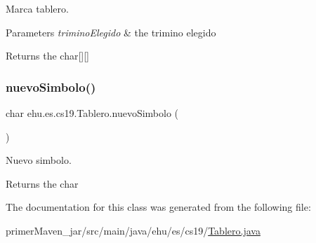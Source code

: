 Marca tablero.


\begin{DoxyParams}{Parameters}
{\em trimino\+Elegido} & the trimino elegido \\
\hline
\end{DoxyParams}
\begin{DoxyReturn}{Returns}
the char\mbox{[}\mbox{]}\mbox{[}\mbox{]} 
\end{DoxyReturn}
\mbox{\label{classehu_1_1es_1_1cs19_1_1_tablero_a35427ed7692ad59556f26281d22625fe}} 
\subsubsection{\texorpdfstring{nuevoSimbolo()}{nuevoSimbolo()}}
{\footnotesize\ttfamily char ehu.\+es.\+cs19.\+Tablero.\+nuevo\+Simbolo (\begin{DoxyParamCaption}{ }\end{DoxyParamCaption})}

Nuevo simbolo.

\begin{DoxyReturn}{Returns}
the char 
\end{DoxyReturn}


The documentation for this class was generated from the following file\+:\begin{DoxyCompactItemize}
\item 
primer\+Maven\+\_\+jar/src/main/java/ehu/es/cs19/\mbox{\hyperlink{_tablero_8java}{Tablero.\+java}}\end{DoxyCompactItemize}
